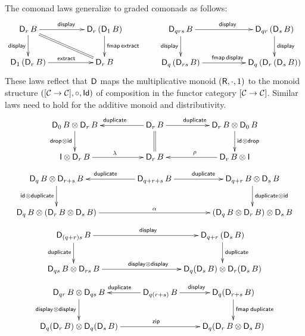 \documentclass[acmsmall,review,anonymous]{acmart}\settopmatter{printfolios=true,printccs=false,printacmref=false}
\theoremstyle{remark}
\begin{document}
The comonad laws generalize to graded comonads as follows:
\[
\xymatrix@C=10ex{
\D[r]\,B  \ar[d]_{\tdisplay} \ar[r]^{\tdisplay} \ar@{=}[dr]
  & \D[r]\,(\D[1]\,B)  \ar[d]^{\tfmap\,\textract}
\\
\D[1]\,(\D[r]\,B) \ar[r]^{\textract}
  & \D[r]\,B
}
\qquad
\xymatrix@C=12ex{
\D[qrs]\,B \ar[d]_{\tdisplay} \ar[r]^{\tdisplay}
  & \D[qr]\,(\D[s]\,B) \ar[d]^{\tdisplay}
\\
\D[q]\,(\D[rs]\,B) \ar[r]^{\tfmap\,\tdisplay}
  & \D[q]\,(\D[r]\,(\D[s]\,B))
}
\]
These laws reflect that $\mathsf{D}_{}$ maps the multiplicative monoid
$(\mathsf{R},{\cdot},1)$ to the monoid structure $([\mathcal{C} \to \mathcal{C}],{\circ},\mathsf{Id})$
of composition in the functor category $[\mathcal{C} \to \mathcal{C}]$.  Similar laws
need to hold for the additive monoid and distributivity.
\[
\xymatrix@C=12ex{
\D[0]\,B \otimes \D[r]\,B \ar[d]_{\tdrop \otimes \tid}
& \D[r]\,B \ar[l]_{\tduplicate} \ar[r]^{\tduplicate} \ar@{=}[d]
& \D[r]\,B \otimes \D[0]\,B \ar[d]^{\tid \otimes \tdrop}
\\
\I \otimes \D[r]\,B \ar[r]^{\Gl}
& \D[r]\,B
& \D[r]\,B \otimes \I \ar[l]_{\Gr}
}
\]
\[
\xymatrix@C=10ex{
\D[q]\,B \otimes \D[r+s]\,B  \ar[d]_{\tid \otimes \tduplicate}
& \D[q+r+s]\,B \ar[l]_{\tduplicate} \ar[r]^{\tduplicate}
& \D[q+r]\,B \otimes \D[s]\,B \ar[d]^{\tduplicate \otimes \tid}
\\
\D[q]\,B \otimes (\D[r]\,B \otimes \D[s]\,B) \ar[rr]^{\Ga}
& & (\D[q]\,B \otimes \D[r]\,B) \otimes \D[s]\,B
}
\]
\[
\xymatrix@C=22ex{
\D[(q+r)s]\,B \ar[r]^{\tdisplay} \ar[d]_{\tduplicate}
& \D[q+r]\,(\D[s]\,B) \ar[d]^{\tduplicate}
\\
\D[qs]\,B \otimes \D[rs]\,B \ar[r]^{\tdisplay \otimes \tdisplay}
& \D[q](\D[s]\,B) \otimes \D[r](\D[s]\,B)
}
\]
\[
\xymatrix{
\D[qr]\,B \otimes \D[qs]\,B \ar[d]_{\display \otimes \display}
  & \D[q(r+s)]\,B \ar[l]_{\tduplicate} \ar[r]^{\display}
  & \D[q](\D[r+s]\,B) \ar[d]^{\fmap\tduplicate}
\\
\D[q](\D[r]\,B) \otimes \D[q](\D[s]\,B) \ar[rr]^{\tzip}
&&
\D[q](\D[r]\,B \otimes \D[s]\,B)
}
\]
\end{document}
